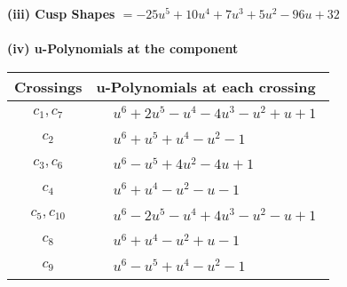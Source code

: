 \documentclass[1p]{elsarticle_modified}
\theoremstyle{definition}
\begin{document}
\flushleft \textbf{(iii) Cusp Shapes $= -25 u^5+10 u^4+7 u^3+5 u^2-96 u+32$}\\~\\
\newpage\renewcommand{\arraystretch}{1}
\flushleft \textbf{(iv) u-Polynomials at the component}\newline \\
\begin{tabular}{m{50pt}|m{274pt}}
Crossings & \hspace{64pt}u-Polynomials at each crossing \\
\hline $$\begin{aligned}c_{1},c_{7}\end{aligned}$$&$\begin{aligned}
&u^6+2 u^5- u^4-4 u^3- u^2+u+1
\end{aligned}$\\
\hline $$\begin{aligned}c_{2}\end{aligned}$$&$\begin{aligned}
&u^6+u^5+u^4- u^2-1
\end{aligned}$\\
\hline $$\begin{aligned}c_{3},c_{6}\end{aligned}$$&$\begin{aligned}
&u^6- u^5+4 u^2-4 u+1
\end{aligned}$\\
\hline $$\begin{aligned}c_{4}\end{aligned}$$&$\begin{aligned}
&u^6+u^4- u^2- u-1
\end{aligned}$\\
\hline $$\begin{aligned}c_{5},c_{10}\end{aligned}$$&$\begin{aligned}
&u^6-2 u^5- u^4+4 u^3- u^2- u+1
\end{aligned}$\\
\hline $$\begin{aligned}c_{8}\end{aligned}$$&$\begin{aligned}
&u^6+u^4- u^2+u-1
\end{aligned}$\\
\hline $$\begin{aligned}c_{9}\end{aligned}$$&$\begin{aligned}
&u^6- u^5+u^4- u^2-1
\end{aligned}$\\
\hline
\end{tabular}\\~\\
\end{document}
